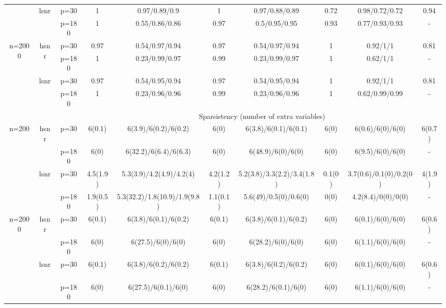 \begin{table}[ht]
{\begin{tabular}{|c|c|c|cc|cc|cc|c|}
  \cmidrule{2-10} & \multirow{2}[2]{*}{lsnr} & p=30 & 1 & 0.97/0.89/0.9 & 1 & 0.97/0.88/0.89 & 0.72 & 0.98/0.72/0.72 & 0.94 \\ 
   &  & p=180 & 1 & 0.55/0.86/0.86 & 0.97 & 0.5/0.95/0.95 & 0.93 & 0.77/0.93/0.93 & - \\ 
  \midrule \multirow{4}[4]{*}{n=2000} & \multirow{2}[2]{*}{hsnr} & p=30 & 0.97 & 0.54/0.97/0.94 & 0.97 & 0.54/0.97/0.94 & 1 & 0.92/1/1 & 0.81 \\ 
   &  & p=180 & 1 & 0.23/0.99/0.97 & 0.99 & 0.23/0.99/0.97 & 1 & 0.62/1/1 & - \\ 
  \cmidrule{2-10} & \multirow{2}[2]{*}{lsnr} & p=30 & 0.97 & 0.54/0.95/0.94 & 0.97 & 0.54/0.95/0.94 & 1 & 0.92/1/1 & 0.81 \\ 
   &  & p=180 & 1 & 0.23/0.96/0.96 & 0.99 & 0.23/0.96/0.96 & 1 & 0.62/0.99/0.99 & - \\ 
   \midrule 
 \multicolumn{1}{|r}{} & \multicolumn{1}{r}{} &       & \multicolumn{7}{c|}{Sparsistency (number of extra variables)} \\
 \midrule 
\multirow{4}[4]{*}{n=200} & \multirow{2}[2]{*}{hsnr} & p=30 & 6(0.1) & 6(3.9)/6(0.2)/6(0.2) & 6(0) & 6(3.8)/6(0.1)/6(0.1) & 6(0) & 6(0.6)/6(0)/6(0) & 6(0.7) \\ 
   &  & p=180 & 6(0) & 6(32.2)/6(6.4)/6(6.3) & 6(0) & 6(48.9)/6(0)/6(0) & 6(0) & 6(9.5)/6(0)/6(0) & - \\ 
  \cmidrule{2-10} & \multirow{2}[2]{*}{lsnr} & p=30 & 4.5(1.9) & 5.3(3.9)/4.2(4.9)/4.2(4) & 4.2(1.2) & 5.2(3.8)/3.3(2.2)/3.4(1.8) & 0.1(0) & 3.7(0.6)/0.1(0)/0.2(0) & 4(1.9) \\ 
   &  & p=180 & 1.9(0.5) & 5.3(32.2)/1.8(10.9)/1.9(9.8) & 1.1(0.1) & 5.6(49)/0.5(0)/0.6(0) & 0(0) & 4.2(8.4)/0(0)/0(0) & - \\ 
  \midrule \multirow{4}[4]{*}{n=2000} & \multirow{2}[2]{*}{hsnr} & p=30 & 6(0.1) & 6(3.8)/6(0.1)/6(0.2) & 6(0.1) & 6(3.8)/6(0.1)/6(0.2) & 6(0) & 6(0.1)/6(0)/6(0) & 6(0.6) \\ 
   &  & p=180 & 6(0) & 6(27.5)/6(0)/6(0) & 6(0) & 6(28.2)/6(0)/6(0) & 6(0) & 6(1.1)/6(0)/6(0) & - \\ 
  \cmidrule{2-10} & \multirow{2}[2]{*}{lsnr} & p=30 & 6(0.1) & 6(3.8)/6(0.2)/6(0.2) & 6(0.1) & 6(3.8)/6(0.2)/6(0.2) & 6(0) & 6(0.1)/6(0)/6(0) & 6(0.6) \\ 
   &  & p=180 & 6(0) & 6(27.5)/6(0.1)/6(0) & 6(0) & 6(28.2)/6(0.1)/6(0) & 6(0) & 6(1.1)/6(0)/6(0) & - \\ 
   \bottomrule 
\end{tabular}
}
\end{table}
